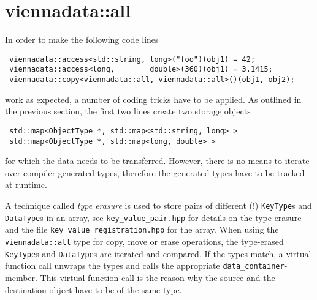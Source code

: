 \section{viennadata::all} \label{sec:viennadata-all}
In order to make the following code lines
\begin{lstlisting}
 viennadata::access<std::string, long>("foo")(obj1) = 42;
 viennadata::access<long,        double>(360)(obj1) = 3.1415;
 viennadata::copy<viennadata::all, viennadata::all>()(obj1, obj2);
\end{lstlisting}
work as expected, a number of coding tricks have to be applied. As outlined in the previous section, the first two lines create two storage objects
\begin{lstlisting}
 std::map<ObjectType *, std::map<std::string, long> >
 std::map<ObjectType *, std::map<long, double> >
\end{lstlisting}
for which the data needs to be transferred. However, there is no means to iterate over compiler generated types, therefore the generated types have to be tracked at runtime.

A technique called \emph{type erasure} \cite{Alexandrescu:ModernCpp} is used to store pairs of different (!) \lstinline|KeyType|s and \lstinline|DataType|s in an array, see \lstinline|key_value_pair.hpp| for details on the type erasure and the file \lstinline|key_value_registration.hpp| for the array. When using the \lstinline|viennadata::all| type for copy, move or erase operations, the type-erased \lstinline|KeyType|s and \lstinline|DataType|s are iterated and compared. If the types match, a virtual function call unwraps the types and calls the appropriate \lstinline|data_container|-member. This virtual function call is the reason why the source and the destination object have to be of the same type.

